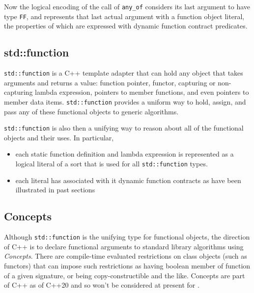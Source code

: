 

Now the logical encoding of the call of \lstinline|any_of| considers its last argument to have type \lstinline|FF|,
and represents that last actual argument with a function object literal, the properties of which are expressed with 
dynamic function contract predicates.

\subsection{std::function}
\label{sec:stdfunction}

\lstinline|std::function| is a C++ template adapter that can hold any object that takes arguments and returns a value: function pointer, 
functor,
capturing or non-capturing lambda expression,
pointers to member functions, 
and even pointers to member data items.
 \lstinline|std::function|  provides a uniform way to hold, assign, and pass any of these functional objects to generic algorithms.
 
 \lstinline|std::function| is also then a unifying way to reason about all of the functional objects and their uses. In particular,
 \begin{itemize}[noitemsep,nolistsep]
 	\item each static function definition and lambda expression is
 	represented as a logical literal of a sort that is used for all
 	\lstinline|std::function| types.
 	\item each literal has associated with it dynamic function contracts as have been illustrated in past sections
 \end{itemize}

\subsection{Concepts}
\label{sec:concepts}
Although \lstinline|std::function| is the unifying type for functional objects, the direction of C++ is to declare functional 
arguments to standard library algorithms using \emph{Concepts}.
There are compile-time evaluated restrictions on class objects (such as
functors) that can impose such restrictions as having boolean member of function of a given signature, or being copy-constructible and the like.
Concepts are part of C++ as of C++20 and so won't be considered 
at present 
for \NAME.


